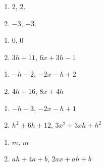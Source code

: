 \begin{multicols}{2}
\begin{enumerate}
\setcounter{enumi}{\value{HW}}
\addtocounter{enumi}{1}

\item $2$, $2$.
\item $-3$, $-3$.

\setcounter{HW}{\value{enumi}}
\end{enumerate}
\end{multicols}

\begin{multicols}{2}
\begin{enumerate}
\setcounter{enumi}{\value{HW}}

\item $0$, $0$
\item $3h+11$, $6x+3h-1$

\setcounter{HW}{\value{enumi}}
\end{enumerate}
\end{multicols}

\begin{multicols}{2}
\begin{enumerate}
\setcounter{enumi}{\value{HW}}

\item $-h-2$, $-2x-h+2$
\item  $4h+16$, $8x+4h$

\setcounter{HW}{\value{enumi}}
\end{enumerate}
\end{multicols}

\begin{multicols}{2}
\begin{enumerate}
\setcounter{enumi}{\value{HW}}

\item $-h-3$, $-2x-h+1$
\item $h^2+6h+12$, $3x^{2} + 3xh + h^{2}$

\setcounter{HW}{\value{enumi}}
\end{enumerate}
\end{multicols}

\begin{multicols}{2}
\begin{enumerate}
\setcounter{enumi}{\value{HW}}

\item $m$, $m$
\item $ah + 4a+b$, $2ax + ah + b$

\setcounter{HW}{\value{enumi}}
\end{enumerate}
\end{multicols}


